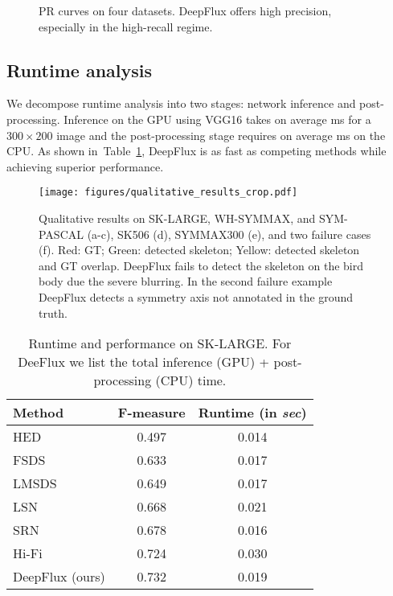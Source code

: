\documentclass[10pt,twocolumn,letterpaper]{article}
\newcommand{\reftab}[1]{Table~\ref{#1}}
\begin{document}
\begin{figure} \centering
{}
\caption{PR curves on four datasets. DeepFlux offers high precision, especially in the high-recall regime.}
\label{fig:prcurve}
\end{figure}

\subsection{Runtime analysis} \label{sec:runtime}
We decompose runtime analysis into two stages: network inference and post-processing.
Inference on the GPU using VGG16 takes on average \unit[14]{ms} for a $300 \times 200$ image and the post-processing stage requires on average \unit[5]{ms} on the CPU.
As shown in~\reftab{tab:runtime}, DeepFlux is as fast as competing methods while achieving superior performance.

\begin{figure*}
\centering
\texttt{[image: figures/qualitative\_results\_crop.pdf]}
\vskip 0.2cm
\caption{Qualitative results on SK-LARGE, WH-SYMMAX, and SYM-PASCAL (a-c), SK506 (d), SYMMAX300 (e), and two failure cases (f). Red: GT; Green: detected skeleton; Yellow: detected skeleton and GT overlap.
DeepFlux fails to detect the skeleton on the bird body due the severe blurring. In the second failure example DeepFlux detects a symmetry axis not annotated in the ground truth.
}
\label{fig:qualitativeresults}
\end{figure*}



\begin{table}
\begin{center}
\begin{tabular}{|l|c|c|}
\hline
Method & F-measure & Runtime (in \emph{sec}) \\
\hline\hline
HED~\cite{xie2015hed} & 0.497 & 0.014 \\
\hline
FSDS~\cite{shen2016fsds} & 0.633 & 0.017 \\
\hline
LMSDS~\cite{shen2017lmsds} & 0.649 & 0.017 \\
\hline
LSN~\cite{liu2018lsn} & 0.668 & 0.021 \\
\hline
SRN~\cite{ke2017srn} & 0.678 & 0.016 \\
\hline
Hi-Fi~\cite{zhao2018hifi} & 0.724 & 0.030 \\
\hline
DeepFlux (ours) & 0.732 & 0.019 \\
\hline
\end{tabular}
\end{center}
\caption{Runtime and performance on SK-LARGE. For DeeFlux we list the total inference (GPU) + post-processing (CPU) time. }
\label{tab:runtime}
\end{table}
\end{document}
